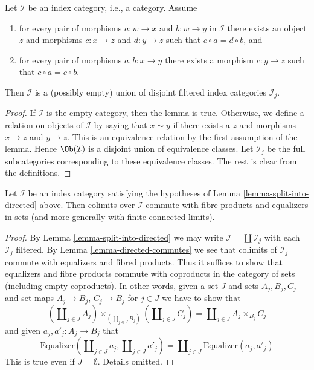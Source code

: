 \begin{lemma}
\label{lemma-split-into-directed}
Let $\mathcal{I}$ be an index category, i.e., a category.
Assume
\begin{enumerate}
\item for every pair of morphisms $a : w \to x$ and $b : w \to y$
in $\mathcal{I}$ there exists an object $z$ and morphisms $c : x \to z$
and $d : y \to z$ such that $c \circ a = d \circ b$, and
\item for every pair of morphisms $a, b : x \to y$ there exists
a morphism $c : y \to z$ such that $c \circ a = c \circ b$.
\end{enumerate}
Then $\mathcal{I}$ is a (possibly empty) union
of disjoint filtered index categories $\mathcal{I}_j$.
\end{lemma}

\begin{proof}
If $\mathcal{I}$ is the empty category, then the lemma is true.
Otherwise, we define a relation on objects of $\mathcal{I}$ by
saying that $x \sim y$ if there exists a $z$ and
morphisms $x \to z$ and $y \to z$. This is an equivalence
relation by the first assumption of the lemma. Hence $\Ob(\mathcal{I})$
is a disjoint union of equivalence classes. Let $\mathcal{I}_j$
be the full subcategories corresponding to these equivalence classes.
The rest is clear from the definitions.
\end{proof}

\begin{lemma}
\label{lemma-almost-directed-commutes-equalizers}
Let $\mathcal{I}$ be an index category satisfying the hypotheses of
Lemma \ref{lemma-split-into-directed} above. Then colimits over $\mathcal{I}$
commute with fibre products and equalizers in sets (and more generally
with finite connected limits).
\end{lemma}

\begin{proof}
By
Lemma \ref{lemma-split-into-directed}
we may write $\mathcal{I} = \coprod \mathcal{I}_j$ with each $\mathcal{I}_j$
filtered. By
Lemma \ref{lemma-directed-commutes}
we see that colimits of $\mathcal{I}_j$ commute with equalizers and
fibred products. Thus it suffices to show that equalizers and fibre products
commute with coproducts in the category of sets (including empty coproducts).
In other words, given a set $J$ and sets $A_j, B_j, C_j$ and set maps
$A_j \to B_j$, $C_j \to B_j$ for $j \in J$ we have to show that
$$
(\coprod\nolimits_{j \in J} A_j)
\times_{(\coprod\nolimits_{j \in J} B_j)}
(\coprod\nolimits_{j \in J} C_j)
=
\coprod\nolimits_{j \in J} A_j \times_{B_j} C_j
$$
and given $a_j, a'_j : A_j \to B_j$ that
$$
\text{Equalizer}(
\coprod\nolimits_{j \in J} a_j,
\coprod\nolimits_{j \in J} a'_j)
=
\coprod\nolimits_{j \in J}
\text{Equalizer}(a_j, a'_j)
$$
This is true even if $J = \emptyset$. Details omitted.
\end{proof}




